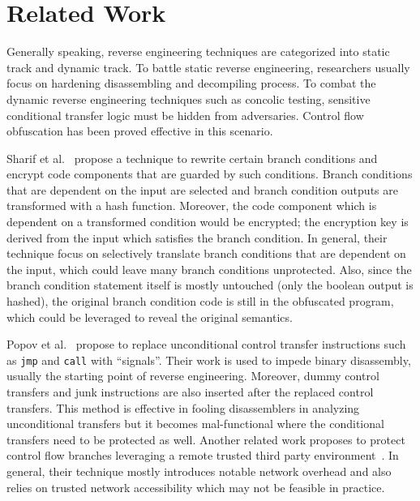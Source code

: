 \documentclass[lnicst]{svmultln}
\begin{document}
%
\section{Related Work}
Generally speaking, reverse engineering techniques are categorized into static
track and dynamic track. To battle static reverse engineering, researchers
usually focus on hardening disassembling and decompiling process. To combat the
dynamic reverse engineering techniques such as concolic testing, sensitive
conditional transfer logic must be hidden from adversaries. Control flow
obfuscation has been proved effective in this scenario.

Sharif et al.~\cite{Sharif} propose a technique to rewrite certain branch
conditions and encrypt code components that are guarded by such conditions.
Branch conditions that are dependent on the input are selected and branch
condition outputs are transformed with a hash function. Moreover, the code
component which is dependent on a transformed condition would be encrypted; the
encryption key is derived from the input which satisfies the branch condition.
In general, their technique focus on selectively translate branch conditions
that are dependent on the input, which could leave many branch conditions
unprotected. Also, since the branch condition statement itself is mostly
untouched (only the boolean output is hashed), the original branch condition
code is still in the obfuscated program, which could be leveraged to reveal the
original semantics.

Popov et al.~\cite{Popov} propose to replace unconditional control transfer
instructions such as \texttt{jmp} and \texttt{call} with ``signals''. Their work
is used to impede binary disassembly, usually the starting point of reverse
engineering. Moreover, dummy control transfers and junk instructions are also
inserted after the replaced control transfers. This method is effective in
fooling disassemblers in analyzing unconditional transfers but it becomes
mal-functional where the conditional transfers need to be protected as well.
Another related work proposes to protect control flow branches leveraging a
remote trusted third party environment~\cite{Zhi}. In general, their technique
mostly introduces notable network overhead and also relies on trusted network
accessibility which may not be feasible in practice.
\end{document}
